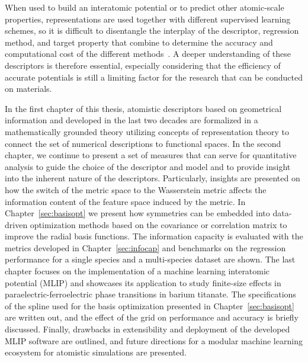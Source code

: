 When used to build an interatomic potential or to predict other atomic-scale properties, representations are used together with different supervised learning schemes, so it is difficult to disentangle the interplay of the descriptor, regression method, and target property that combine to determine the accuracy and computational cost of the different methods~\cite{zuo+20jpcl}.
A deeper understanding of these descriptors is therefore essential, especially considering that the efficiency of accurate potentials is still a limiting factor for the research that can be conducted on materials.

In the first chapter of this thesis, atomistic descriptors based on geometrical information and developed in the last two decades are formalized in a mathematically grounded theory utilizing concepts of representation theory to connect the set of numerical descriptions to functional spaces. %
In the second chapter, we continue to present a set of measures that can serve for quantitative analysis to guide the choice of the descriptor and model and to provide insight into the inherent nature of the descriptors.
Particularly, insights are presented on how the switch of the metric space to the Wasserstein metric affects the information content of the feature space induced by the metric.
In Chapter~\ref{sec:basisopt} we present how symmetries can be embedded into data-driven optimization methods based on the covariance or correlation matrix to improve the radial basis functions.
The information capacity is evaluated with the metrics developed in Chapter~\ref{sec:infocap} and benchmarks on the regression performance for a single species and a multi-species dataset are shown.
The last chapter focuses on the implementation of a machine learning interatomic potential (MLIP) and showcases its application to study finite-size effects in paraelectric-ferroelectric phase transitions in barium titanate.
The specifications of the spline used for the basis optimization presented in Chapter~\ref{sec:basisopt} are written out, and the effect of the grid on performance and accuracy is briefly discussed.
Finally, drawbacks in extensibility and deployment of the developed MLIP software are outlined, and future directions for a modular machine learning ecosystem for atomistic simulations are presented.

